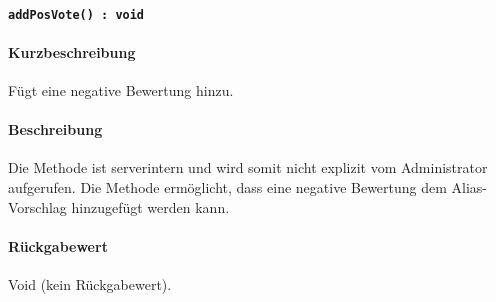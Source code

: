 \paragraph{\texttt{addPosVote() : void}}%
\paragraph*{Kurzbeschreibung}
Fügt eine negative Bewertung hinzu.
\paragraph*{Beschreibung}
Die Methode ist serverintern und wird somit nicht explizit vom Administrator aufgerufen.
Die Methode ermöglicht, dass eine negative Bewertung dem Alias-Vorschlag hinzugefügt werden kann.
\paragraph*{Rückgabewert}
Void (kein Rückgabewert).
